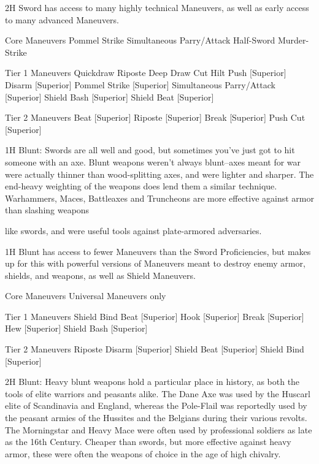 \documentclass[oneside,11pt,english]{book}
\begin{document}
 

2H Sword has access to many highly technical Maneuvers, as well as early access to many advanced 
Maneuvers. 

 

Core Maneuvers 
Pommel Strike 
Simultaneous Parry/Attack 
Half-Sword 
Murder-Strike 

 

Tier 1 Maneuvers 
Quickdraw 
Riposte 
Deep Draw Cut 
Hilt Push [Superior] 
Disarm [Superior] 
Pommel Strike [Superior] 
Simultaneous Parry/Attack [Superior] 
Shield Bash [Superior] 
Shield Beat [Superior] 

 

Tier 2 Maneuvers 
Beat [Superior] 
Riposte [Superior] 
Break [Superior] 
Push Cut [Superior] 

 

1H Blunt: Swords are all well and good, but sometimes you’ve just got to hit someone with an axe. Blunt 
weapons weren’t always blunt--axes meant for war were actually thinner than wood-splitting axes, and 
were lighter and sharper. The end-heavy weighting of the weapons does lend them a similar technique. 
Warhammers, Maces, Battleaxes and Truncheons are more effective against armor than slashing weapons 


like swords, and were useful tools against plate-armored adversaries. 

 

1H Blunt has access to fewer Maneuvers than the Sword Proficiencies, but makes up for this with 
powerful versions of Maneuvers meant to destroy enemy armor, shields, and weapons, as well as Shield 
Maneuvers. 

 

Core Maneuvers 
Universal Maneuvers only 

 

Tier 1 Maneuvers 
Shield Bind 
Beat [Superior] 
Hook [Superior] 
Break [Superior] 
Hew [Superior] 
Shield Bash [Superior] 

 

Tier 2 Maneuvers 
Riposte 
Disarm [Superior] 
Shield Beat [Superior] 
Shield Bind [Superior] 

 

2H Blunt: Heavy blunt weapons hold a particular place in history, as both the tools of elite warriors and 
peasants alike. The Dane Axe was used by the Huscarl elite of Scandinavia and England, whereas the 
Pole-Flail was reportedly used by the peasant armies of the Hussites and the Belgians during their various 
revolts. The Morningstar and Heavy Mace were often used by professional soldiers as late as the 16th 
Century. Cheaper than swords, but more effective against heavy armor, these were often the weapons of 
choice in the age of high chivalry. 
\end{document}
